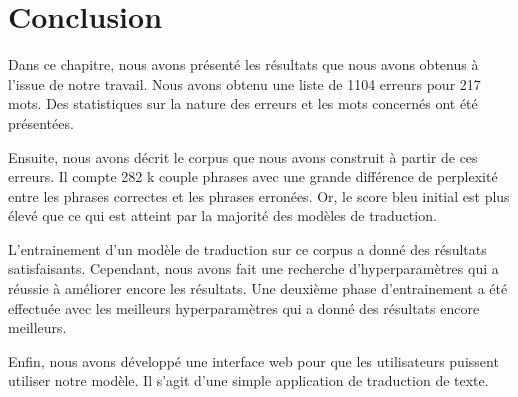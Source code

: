 \section{Conclusion}%
\label{sec.results.conclusion}

Dans ce chapitre, nous avons présenté les résultats que nous avons obtenus à l'issue de notre travail.
Nous avons obtenu une liste de 1104 erreurs pour 217 mots.
Des statistiques sur la nature des erreurs et les mots concernés ont été présentées.

Ensuite, nous avons décrit le corpus que nous avons construit à partir de ces erreurs.
Il compte 282 k couple phrases avec une grande différence de perplexité 
entre les phrases correctes et les phrases erronées.
Or, le score \gls{bleu} initial 
est plus élevé que ce qui est atteint par la majorité des modèles de traduction.

L'entrainement d'un modèle de traduction sur ce corpus a donné des résultats satisfaisants.
Cependant, nous avons fait une recherche d'hyperparamètres qui a réussie à améliorer encore les résultats.
Une deuxième phase d'entrainement a été effectuée avec les meilleurs hyperparamètres 
qui a donné des résultats encore meilleurs.

Enfin, nous avons développé une interface web pour que les utilisateurs puissent utiliser notre modèle.
Il s'agit d'une simple application de traduction de texte.